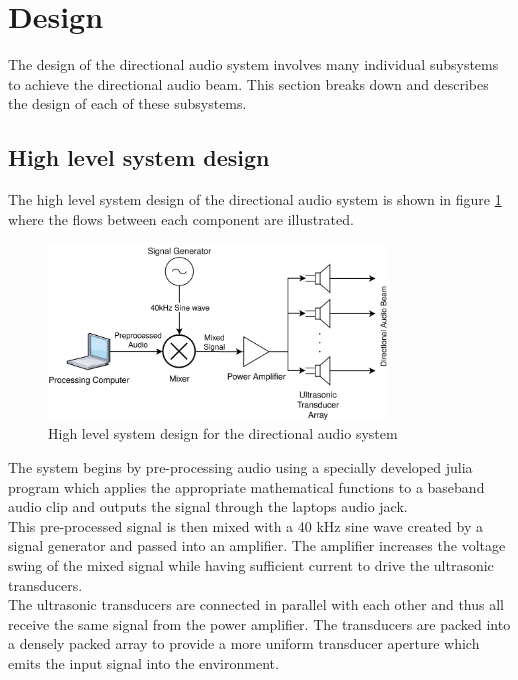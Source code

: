 \section{Design}
The design of the directional audio system involves many individual subsystems to achieve the directional audio beam. This section breaks down and describes the design of each of these subsystems.
\subsection{High level system design}
The high level system design of the directional audio system is shown in figure \ref{fig:highleveldesign} where the flows between each component are illustrated. 
\begin{figure}[h]
    \centering
    \includegraphics[width=0.8\textwidth]{Figures/Design/HighlevelSystemDesign.png}
    \caption{High level system design for the directional audio system}
    \label{fig:highleveldesign}
\end{figure}
The system begins by pre-processing audio using a specially developed julia program which applies the appropriate mathematical functions to a baseband audio clip and outputs the signal through the laptops audio jack.\\
This pre-processed signal is then mixed with a 40 kHz sine wave created by a signal generator and passed into an amplifier. The amplifier increases the voltage swing of the mixed signal while having sufficient current to drive the ultrasonic transducers.\\
The ultrasonic transducers are connected in parallel with each other and thus all receive the same signal from the power amplifier. The transducers are packed into a densely packed array to provide a more uniform transducer aperture which emits the input signal into the environment.


